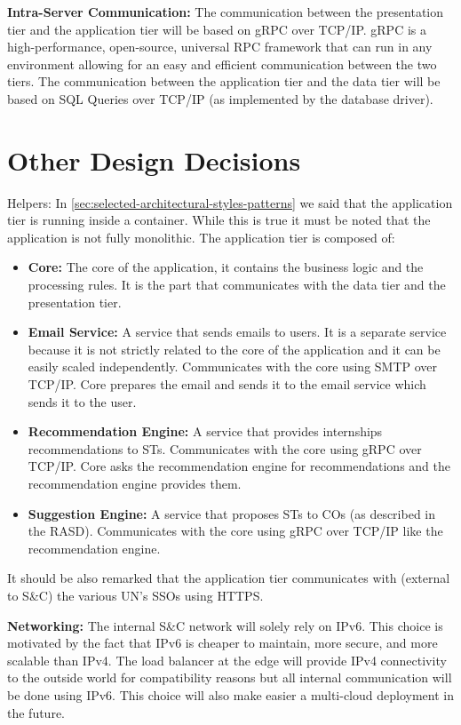 \par{\textbf{Intra-Server Communication:}} The communication between the presentation tier and the application tier
will be based on gRPC over TCP/IP. gRPC is a high-performance, open-source, universal RPC framework that can run in any
environment allowing for an easy and efficient communication between the two tiers. The communication between the
application tier and the data tier will be based on SQL Queries over TCP/IP (as implemented by the database driver).

\section{Other Design Decisions}
\label{sec:other-design-decisions}%

\par{Helpers:} In \ref{sec:selected-architectural-styles-patterns} we said that the application tier is running inside a
container. While this is true it must be noted that the application is not fully monolithic. The application tier is
composed of:

\begin{itemize}
      \item \textbf{Core:} The core of the application, it contains the business logic and the processing rules. It is
            the part that communicates with the data tier and the presentation tier.
      \item \textbf{Email Service:} A service that sends emails to users. It is a separate service because it is not
            strictly related to the core of the application and it can be easily scaled independently. Communicates
            with the core using SMTP over TCP/IP. Core prepares the email and sends it to the email service which
            sends it to the user.
      \item \textbf{Recommendation Engine:} A service that provides internships recommendations to STs. Communicates
            with the core using gRPC over TCP/IP. Core asks the recommendation engine for recommendations and the
            recommendation engine provides them.
      \item \textbf{Suggestion Engine:} A service that proposes STs to COs (as described in the RASD). Communicates with
            the core using gRPC over TCP/IP like the recommendation engine.
\end{itemize}

It should be also remarked that the application tier communicates with (external to S\&C) the various UN's SSOs using
HTTPS.

\par{\textbf{Networking:}} The internal S\&C network will solely rely on IPv6. This choice is motivated by the fact that
IPv6 is cheaper to maintain, more secure, and more scalable than IPv4. The load balancer at the edge will provide IPv4
connectivity to the outside world for compatibility reasons but all internal communication will be done using IPv6.
This choice will also make easier a multi-cloud deployment in the future.
